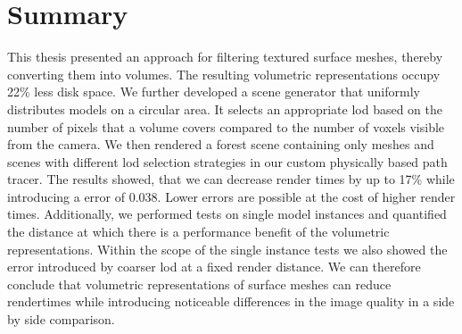 \chapter{Summary}
\label{chap:summary}
This thesis presented an approach for filtering textured surface meshes, thereby converting them into volumes.
The resulting volumetric representations occupy 22\% less disk space.
We further developed a scene generator that uniformly distributes models on a circular area.
It selects an appropriate \ac{lod} based on the number of pixels that a volume covers compared to the number of voxels visible from the camera.
We then rendered a forest scene containing only meshes and scenes with different \ac{lod} selection strategies in our custom physically based path tracer.
The results showed, that we can decrease render times by up to 17\% while introducing a \FLIP error of 0.038.
Lower \FLIP errors are possible at the cost of higher render times.
Additionally, we performed tests on single model instances and quantified the distance at which there is a performance benefit of the volumetric representations.
Within the scope of the single instance tests we also showed the error introduced by coarser \ac{lod} at a fixed render distance.
We can therefore conclude that volumetric representations of surface meshes can reduce rendertimes while introducing noticeable differences in the image quality in a side by side comparison.